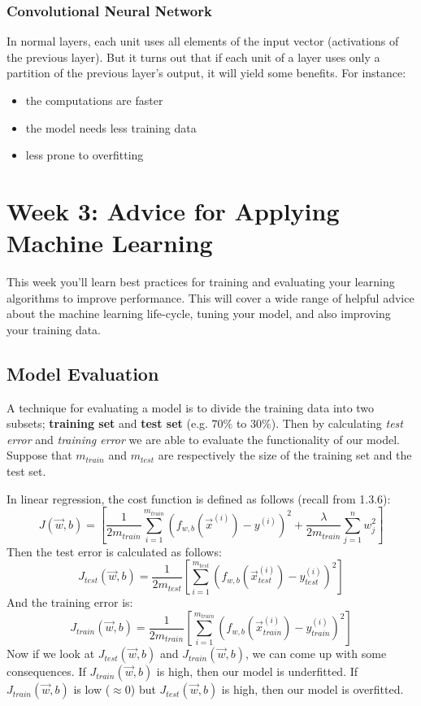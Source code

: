 \documentclass[a4paper, 12pt]{book}
\begin{document}
\subsubsection{Convolutional Neural Network}
In normal layers, each unit uses all elements of the input vector (activations of the previous layer). But it turns out that if each unit of a layer uses only a partition of the previous layer's output, it will yield some benefits. For instance:
\begin{itemize}
    \item the computations are faster
    \item the model needs less training data
    \item less prone to overfitting
\end{itemize}

\section{Week 3: Advice for Applying Machine Learning}
This week you'll learn best practices for training and evaluating your learning algorithms to improve performance. This will cover a wide range of helpful advice about the machine learning life-cycle, tuning your model, and also improving your training data.

\subsection{Model Evaluation}
A technique for evaluating a model is to divide the training data into two subsets; \textbf{training set} and \textbf{test set} (e.g. $70\%$ to $30\%$). Then by calculating \emph{test error} and \emph{training error} we are able to evaluate the functionality of our model. Suppose that $m_{train}$ and $m_{test}$ are respectively the size of the training set and the test set.

In linear regression, the cost function is defined as follows (recall from 1.3.6):
\[J(\Vec{w},b) = \left[\frac{1}{2m_{train}} \sum_{i=1}^{m_{train}} (f_{w,b}(\Vec{x}^{(i)}) - y^{(i)})^2 + \frac{\lambda}{2m_{train}} \sum_{j=1}^{n} w_j^2\right]\]
Then the test error is calculated as follows:
\[J_{test}(\Vec{w},b) = \frac{1}{2m_{test}} \left[ \sum_{i=1}^{m_{test}} (f_{w,b}(\Vec{x}_{test}^{(i)}) - y_{test}^{(i)})^2\right]\]
And the training error is:
\[J_{train}(\Vec{w}, b) = \frac{1}{2m_{train}} \left[ \sum_{i=1}^{m_{train}} (f_{w,b}(\Vec{x}_{train}^{(i)}) - y_{train}^{(i)})^2\right]\]
Now if we look at $J_{test}(\Vec{w},b)$ and $J_{train}(\Vec{w},b)$, we can come up with some consequences. If $J_{train}(\Vec{w},b)$ is high, then our model is underfitted. If $J_{train}(\Vec{w},b)$ is low ($\approx 0$) but $J_{test}(\Vec{w},b)$ is high, then our model is overfitted.
\end{document}
